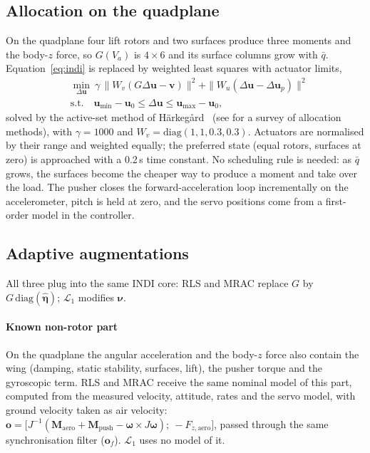 \documentclass[preprint,12pt,a4paper]{elsarticle}
\newcommand{\vect}[1]{\bm{#1}}
\begin{document}
\subsection{Allocation on the quadplane}
On the quadplane four lift rotors and two surfaces produce three moments and the body-$z$ force, so $G(V_a)$ is
$4\times 6$ and its surface columns grow with $\bar q$. Equation~\eqref{eq:indi} is replaced by weighted least squares with
actuator limits,
\begin{equation}
\begin{aligned}
&\min_{\Delta\vect u}\ \gamma\,\|W_v(G\Delta\vect u - \vect v)\|^2 + \|W_u(\Delta\vect u - \Delta\vect u_p)\|^2\\
&\text{s.t.}\quad \vect u_{\min} - \vect u_0 \le \Delta\vect u \le \vect u_{\max} - \vect u_0,
\end{aligned}
\end{equation}
solved by the active-set method of H\"{a}rkeg\aa{}rd~\cite{harkegard2002} (see \cite{johansen2013} for a survey of allocation methods), with $\gamma = 1000$ and
$W_v = \mathrm{diag}(1,1,0.3,0.3)$. Actuators are
normalised by their range and weighted equally; the preferred state (equal rotors, surfaces at zero) is approached with a 0.2\,s
time constant. No scheduling rule is needed: as $\bar q$ grows, the surfaces become the cheaper way to produce a moment and
take over the load. The pusher closes the forward-acceleration loop incrementally on the accelerometer, pitch is held at zero,
and the servo positions come from a first-order model in the controller.

\subsection{Adaptive augmentations}
All three plug into the same INDI core: RLS and MRAC replace $G$ by $G\,\mathrm{diag}(\hat{\vect\eta})$; $\mathcal{L}_1$
modifies $\vect\nu$.

\paragraph{Known non-rotor part} On the quadplane the angular acceleration and the body-$z$ force also contain the wing (damping,
static stability, surfaces, lift), the pusher torque and the gyroscopic term. RLS and MRAC receive the same nominal model of this part,
computed from the measured velocity, attitude, rates and the servo model, with ground velocity taken as air velocity:
$\vect o = \big[J^{-1}(\vect M_\text{aero} + \vect M_\text{push} - \vect\omega\times J\vect\omega);\ -F_{z,\text{aero}}\big]$, passed through the
same synchronisation filter ($\vect o_f$). $\mathcal{L}_1$ uses no model of it.
\end{document}
